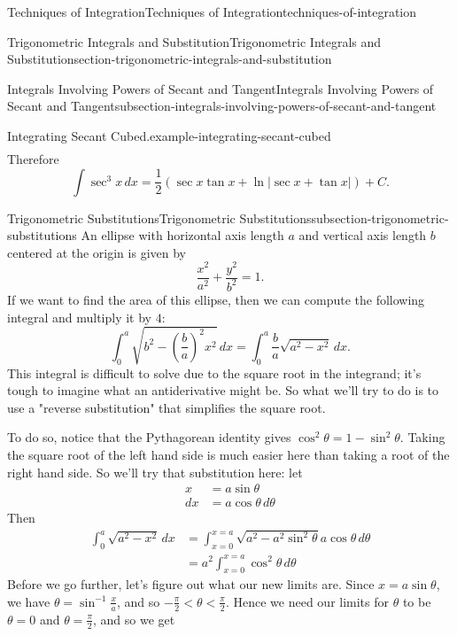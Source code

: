 \documentclass[oneside,10pt,]{book}
\numberwithin{equation}{section}
\newcommand{\lt}{<}
\begin{document}
\begin{chapterptx}{Techniques of Integration}{}{Techniques of Integration}{}{}{techniques-of-integration}
\begin{sectionptx}{Trigonometric Integrals and Substitution}{}{Trigonometric Integrals and Substitution}{}{}{section-trigonometric-integrals-and-substitution}
\begin{subsectionptx}{Integrals Involving Powers of Secant and Tangent}{}{Integrals Involving Powers of Secant and Tangent}{}{}{subsection-integrals-involving-powers-of-secant-and-tangent}
\begin{example}{Integrating Secant Cubed.}{example-integrating-secant-cubed}
\begin{align*}
\end{align*}
\hypertarget{p-541}{}%
Therefore%
\begin{equation*}
\int\sec^{3}x\,dx = \frac{1}{2}(\sec x\tan x + \ln|\sec x + \tan x|) + C.
\end{equation*}
%
\end{example}
\end{subsectionptx}
%
%
\typeout{************************************************}
\typeout{************************************************}
%
\begin{subsectionptx}{Trigonometric Substitutions}{}{Trigonometric Substitutions}{}{}{subsection-trigonometric-substitutions}
\hypertarget{p-542}{}%
An ellipse with horizontal axis length \(a\) and vertical axis length \(b\) centered at the origin is given by%
\begin{equation*}
\frac{x^{2}}{a^{2}} + \frac{y^{2}}{b^{2}} = 1.
\end{equation*}
If we want to find the area of this ellipse, then we can compute the following integral and multiply it by \(4\):%
\begin{equation*}
\int_{0}^{a}\sqrt{b^{2} - (\frac{b}{a})^{2}x^{2}}\,dx = \int_{0}^{a}\frac{b}{a}\sqrt{a^{2} - x^{2}}\,dx.
\end{equation*}
This integral is difficult to solve due to the square root in the integrand; it's tough to imagine what an antiderivative might be. So what we'll try to do is to use a "reverse substitution" that simplifies the square root.%
\par
\hypertarget{p-543}{}%
To do so, notice that the Pythagorean identity gives \(\cos^{2}\theta = 1 - \sin^{2}\theta\). Taking the square root of the left hand side is much easier here than taking a root of the right hand side. So we'll try that substitution here: let%
\begin{align*}
x & = a\sin\theta \\
dx & = a\cos\theta\,d\theta 
\end{align*}
Then%
\begin{align*}
\int_{0}^{a}\sqrt{a^{2} - x^{2}}\,dx & = \int_{x = 0}^{x = a}\sqrt{a^{2} - a^{2}\sin^{2}\theta}a\cos\theta\,d\theta \\
& = a^{2}\int_{x = 0}^{x = a}\cos^{2}\theta\,d\theta 
\end{align*}
Before we go further, let's figure out what our new limits are. Since \(x = a\sin\theta\), we have \(\theta = \sin^{-1}\frac{x}{a}\), and so \(-\frac{\pi}{2} \lt \theta \lt \frac{\pi}{2}\). Hence we need our limits for \(\theta\) to be \(\theta = 0\) and \(\theta = \frac{\pi}{2}\), and so we get%

\end{subsectionptx}
\end{sectionptx}
\end{chapterptx}
\end{document}
